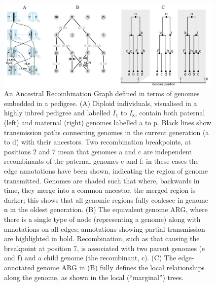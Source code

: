 \documentclass{article}
\begin{document}
\begin{figure}
\begin{center}
    \includegraphics[width=\textwidth]{illustrations/arg-in-pedigree}
\end{center}
\caption{\label{fig-arg-in-pedigree}
An Ancestral Recombination Graph defined in terms of genomes embedded
in a pedigree. (A) Diploid individuals, visualised in a highly inbred pedigree and
labelled $I_1$ to $I_8$, contain both paternal (left) and maternal (right) genomes
labelled \textsf{a} to \textsf{p}. Black lines show transmission paths connecting
genomes in the current generation (\textsf{a} to \textsf{d}) with their ancestors.
Two recombination breakpoints, at positions 2 and 7 mean that genomes \textsf{a}
and \textsf{c} are independent recombinants of the paternal genomes \textsf{e}
and \textsf{f}: in these cases the edge annotations have been shown, indicating the
region of genome transmitted. Genomes are shaded such that where, backwards in time,
they merge into a common ancestor, the merged region is darker; this shows that all
genomic regions fully coalesce in genome \textsf{n} in the oldest generation.
(B) The equivalent genome ARG, where there is a single type of node (representing
a genome) along with annotations on all edges; annotations showing partial
transmission are highlighted in bold. Recombination, such as that causing the
breakpoint at position 7, is associated with two parent genomes (\textsf{e} and
\textsf{f}) and a child genome (the recombinant, \textsf{c}).
(C) The edge-annotated genome ARG in (B) fully defines the
local relationships along the genome, as shown in the local
(``marginal'') trees.
}
\end{figure}
\end{document}
